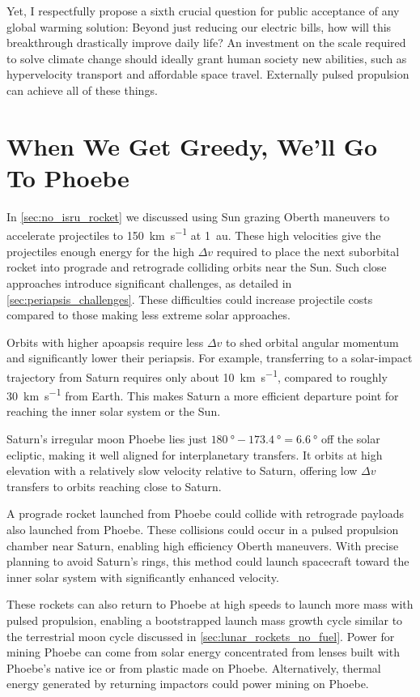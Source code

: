 \documentclass{article}
\begin{document}
Yet, I respectfully propose a sixth crucial question for public acceptance of any global warming solution: Beyond just reducing our electric bills, how will this breakthrough drastically improve daily life? An investment on the scale required to solve climate change should ideally grant human society new abilities, such as hypervelocity transport and affordable space travel. Externally pulsed propulsion can achieve all of these things.  

\section{When We Get Greedy, We'll Go To Phoebe}\label{sec:greedy_phoebe}
In \autoref{sec:no_isru_rocket} we discussed using Sun grazing Oberth maneuvers to accelerate projectiles to \SI{150}{\kilo\meter\per\second} at \SI{1}{\astronomicalunit}. These high velocities give the projectiles enough energy for the high $\Delta v$ required to place the next suborbital rocket into  prograde and retrograde colliding orbits near the Sun. Such close approaches introduce significant challenges, as detailed in \autoref{sec:periapsis_challenges}. These difficulties could increase projectile costs compared to those making less extreme solar approaches.

Orbits with higher apoapsis require less $\Delta v$ to shed orbital angular momentum and significantly lower their periapsis. For example, transferring to a solar-impact trajectory from Saturn requires only about \SI{10}{\kilo\meter\per\second}, compared to roughly \SI{30}{\kilo\meter\per\second} from Earth. This makes Saturn a more efficient departure point for reaching the inner solar system or the Sun.

Saturn’s irregular moon Phoebe lies just $\SI{180}{\degree} - \SI{173.4}{\degree} = \SI{6.6}{\degree}$ off the solar ecliptic, making it well aligned for interplanetary transfers. It orbits at high elevation with a relatively slow velocity relative to Saturn, offering low $\Delta v$ transfers to orbits reaching close to Saturn.

A prograde rocket launched from Phoebe could collide with retrograde payloads also launched from Phoebe. These collisions could occur in a pulsed propulsion chamber near Saturn, enabling high efficiency Oberth maneuvers. With precise planning to avoid Saturn’s rings, this method could launch spacecraft toward the inner solar system with significantly enhanced velocity.

These rockets can also return to Phoebe at high speeds to launch more mass with pulsed propulsion, enabling a bootstrapped launch mass growth cycle similar to the terrestrial moon cycle discussed in \autoref{sec:lunar_rockets_no_fuel}. Power for mining Phoebe can come from solar energy concentrated from lenses built with Phoebe’s native ice or from plastic made on Phoebe.  Alternatively, thermal energy generated by returning impactors could power mining on Phoebe.
\end{document}
